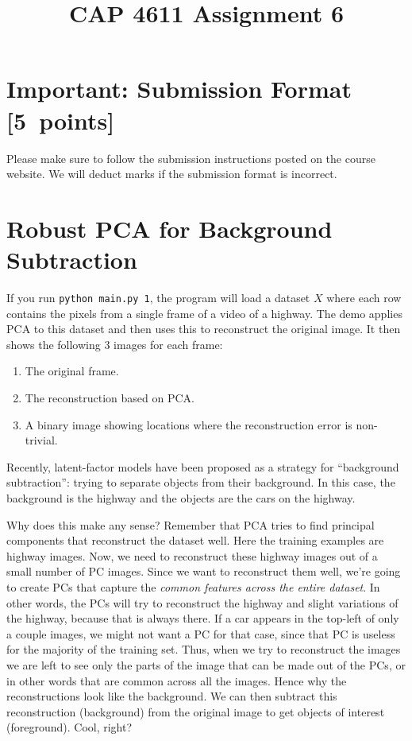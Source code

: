 \documentclass{article}
\newcommand{\blu}[1]{{\textcolor{blu}{#1}}}
\let\ask\blu
\newcommand\pts[1]{\textcolor{pointscolour}{[#1~points]}}
\begin{document}
\title{CAP 4611 Assignment 6}
\date{}
\maketitle
\vspace{-6em}


\section*{Important: Submission Format \pts{5}}

    Please make sure to follow the submission instructions posted on the course website.
    \ask{We will deduct marks if the submission format is incorrect.}

\vspace{1em}

\section{Robust PCA for Background Subtraction}

If you run \verb|python main.py 1|, the program will load a dataset $X$ where each row contains the pixels from a single frame of a video of a highway. The demo applies PCA to this dataset and then uses this to reconstruct the original image.
It then shows the following 3 images for each frame:
\begin{enumerate}
	\item The original frame.
	\item The reconstruction based on PCA.
	\item A binary image showing locations where the reconstruction error is non-trivial.
\end{enumerate}
Recently, latent-factor models have been proposed as a strategy for ``background subtraction'': trying to separate objects from their background. In this case, the background is the highway and the objects are the cars on the highway.

Why does this make any sense? Remember that PCA tries to find principal components that reconstruct the dataset well. Here the training examples are highway images. Now, we need to reconstruct these highway images out of a small number of PC images. Since we want to reconstruct them well, we're going to create PCs that capture the \emph{common features across the entire dataset}. In other words, the PCs will try to reconstruct the highway and slight variations of the highway, because that is always there. If a car appears in the top-left of only a couple images, we might not want a PC for that case, since that PC is useless for the majority of the training set. Thus, when we try to reconstruct the images we are left to see only the parts of the image that can be made out of the PCs, or in other words that are common across all the images. Hence why the reconstructions look like the background. We can then subtract this reconstruction (background) from the original image to get objects of interest (foreground). Cool, right?
\end{document}
